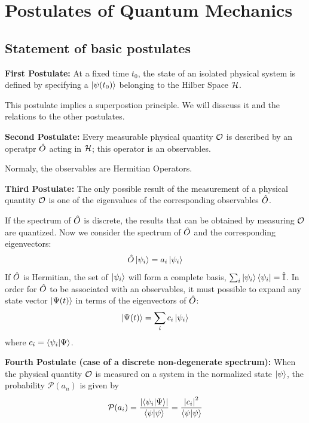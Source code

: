 \chapter{Postulates of Quantum Mechanics}
\section{Statement of basic postulates}
\begin{tcolorbox}{\textbf{First Postulate:}}
    At a fixed time $t_0$, the state of an isolated physical system is defined by specifying a $\ket{\psi(t_0)}$ belonging to the Hilber Space $\mathcal{H}$.
\end{tcolorbox}
This postulate implies a superpostion principle. We will disscuss it and the relations to the other postulates.

\begin{tcolorbox}{\textbf{Second Postulate:}}
    Every measurable physical quantity $\mathcal{O}$ is described by an operatpr $\hat{O}$ acting in $\mathcal{H}$; this operator is an observables.
\end{tcolorbox}
Normaly, the observables are Hermitian Operators.
\begin{tcolorbox}{\textbf{Third Postulate:}}
    The only possible result of the measurement of a physical quantity $\mathcal{O}$ is one of the eigenvalues of the corresponding observables $\hat{O}$.
\end{tcolorbox}
If the spectrum of $\hat{O}$ is discrete, the results that can be obtained by measuring $\mathcal{O}$ are quantized. Now we consider the spectrum of $\hat{O}$ and the corresponding eigenvectors: 
\begin{eqnarray}
    \hat{O} \ket{\psi_i} = a_i \ket{\psi_i}
\end{eqnarray}
If $\hat{O}$ is Hermitian, the set of $\ket{\psi_i}$ will form a complete basis, $\sum_i \ket{\psi_i}\bra{\psi_i} = \hat{\mathbb{I}}$. In order for $\hat{O}$ to be associated with an observables, it must possible to expand any state vector $\ket{\Psi(t)}$ in terms of the eigenvectors of $\hat{O}$: 
\begin{eqnarray}
    \ket{\Psi(t)} = \sum_i c_i \ket{\psi_i}
\end{eqnarray}
where $c_i = \braket{\psi_i| \Psi}$.
\begin{tcolorbox}{\textbf{Fourth Postulate (case of a discrete non-degenerate spectrum):}}
    When the physical quantity $\mathcal{O}$ is measured on a system in the normalized state $\ket{\psi}$, the probability $\mathcal{P}(a_n)$ is given by 
    \begin{eqnarray}
        \mathcal{P}(a_i) = \frac{\left| \braket{\psi_i|\Psi} \right|}{\braket{\psi|\psi}} = \frac{\left| c_i \right|^2}{\braket{\psi|\psi}}
    \end{eqnarray}
\end{tcolorbox} 




